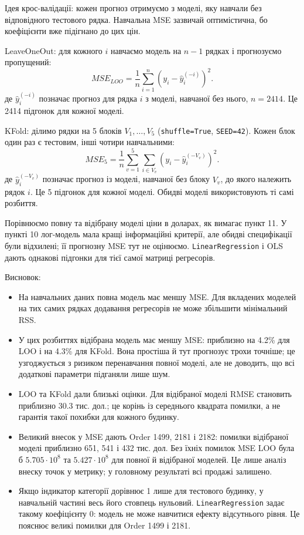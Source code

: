\answerheading
Ідея крос-валідації: кожен прогноз отримуємо з моделі, яку навчали без
відповідного тестового рядка. Навчальна MSE зазвичай оптимістична, бо
коефіцієнти вже підігнано до цих цін.

LeaveOneOut: для кожного \(i\) навчаємо модель на \(n-1\) рядках і
прогнозуємо пропущений:
\[MSE_{LOO}=\frac1n\sum_{i=1}^n(y_i-\widehat y_i^{(-i)})^2.\] де
\(\widehat y_i^{(-i)}\) позначає прогноз для рядка \(i\) з моделі,
навчаної без нього, \(n=2414\). Це 2414 підгонок для кожної моделі.

KFold: ділимо рядки на 5 блоків \(V_1,\ldots,V_5\)
(\texttt{shuffle=True}, \texttt{SEED=42}). Кожен блок один раз є
тестовим, інші чотири навчальними:
\[MSE_5=\frac1n\sum_{v=1}^5\sum_{i\in V_v}(y_i-\widehat y_i^{(-V_v)})^2.\]
де \(\widehat y_i^{(-V_v)}\) позначає прогноз із моделі, навчаної без
блоку \(V_v\), до якого належить рядок \(i\). Це 5 підгонок для кожної
моделі. Обидві моделі використовують ті самі розбиття.

Порівнюємо повну та відібрану моделі ціни в доларах, як вимагає пункт
11. У пункті 10 лог-модель мала кращі інформаційні критерії, але обидві
специфікації були відхилені; її прогнозну MSE тут не оцінюємо.
\texttt{LinearRegression} і OLS дають однакові підгонки для тієї самої
матриці регресорів.

Висновок:

\begin{itemize}
\item
  На навчальних даних повна модель має меншу MSE. Для вкладених моделей
  на тих самих рядках додавання регресорів не може збільшити мінімальний
  RSS.
\item
  У цих розбиттях відібрана модель має меншу MSE: приблизно на 4.2\% для
  LOO і на 4.3\% для KFold. Вона простіша й тут прогнозує трохи точніше;
  це узгоджується з ризиком перенавчання повної моделі, але не доводить,
  що всі додаткові параметри підганяли лише шум.
\item
  LOO та KFold дали близькі оцінки. Для відібраної моделі RMSE становить
  приблизно 30.3 тис. дол.; це корінь із середнього квадрата помилки, а
  не гарантія такої похибки для кожного будинку.
\item
  Великий внесок у MSE дають Order 1499, 2181 і 2182: помилки відібраної
  моделі приблизно 651, 541 і 432 тис. дол. Без їхніх помилок MSE LOO
  була б \(5.705\cdot10^8\) та \(5.427\cdot10^8\) для повної й
  відібраної моделей. Це лише аналіз внеску точок у метрику; у головному
  результаті всі продажі залишено.
\item
  Якщо індикатор категорії дорівнює 1 лише для тестового будинку, у
  навчальній частині весь його стовпець нульовий.
  \texttt{LinearRegression} задає такому коефіцієнту 0: модель не може
  навчитися ефекту відсутнього рівня. Це пояснює великі помилки для
  Order 1499 і 2181.
\end{itemize}


